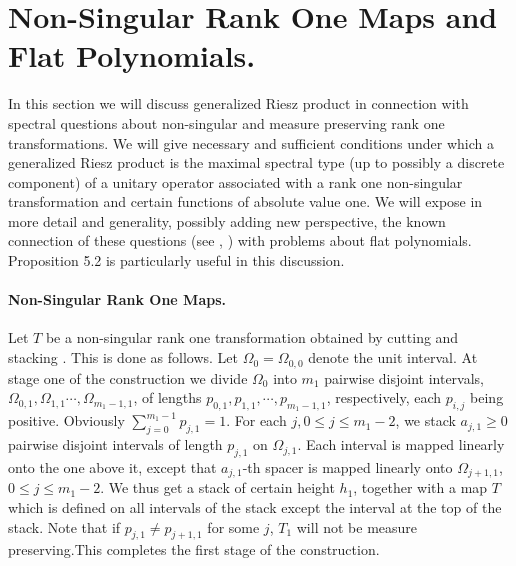\documentclass{amsart}
\theoremstyle{definition}
\theoremstyle{remark}
\numberwithin{equation}{section}
\newcommand{\1}{\mathbb{1}}
\begin{document}
\section{Non-Singular Rank One Maps and Flat Polynomials.}

In this section we will discuss generalized Riesz product in connection with spectral questions about non-singular and measure preserving rank one transformations. We will
 give necessary and sufficient conditions under which a generalized Riesz product is the maximal spectral type (up to possibly a discrete component) of a unitary operator associated with a rank one non-singular transformation and certain functions of absolute value one.
  We will expose in more detail and generality, possibly adding new perspective, the known connection of these questions (see \cite{Guenais}, \cite{down}) with problems about flat polynomials. Proposition 5.2 is particularly useful in this discussion.\\

\paragraph{\textbf{Non-Singular Rank One Maps.}}

Let $T$ be a non-singular rank one transformation obtained by cutting and stacking \cite{Friedman}. This is done as follows. Let $\Omega_0 = \Omega_{0,0}$ denote the unit interval. At stage one of the construction we divide $\Omega_0$ into $m_1$ pairwise disjoint intervals, $\Omega_{0,1}, \Omega_{1, 1} \cdots, \Omega_{m_1-1, 1}$, of lengths $p_{0,1}, p_{1,1},\cdots, p_{m_1-1, 1}$, respectively, each $p_{i,j}$ being positive. Obviously $\sum_{j=0}^{m_1-1}p_{j,1}=1$. For each $j, 0\leq j \leq m_1-2$,  we stack $a_{j,1} \geq 0$ pairwise disjoint intervals of length $p_{j,1}$ on  $\Omega_{j,1}$. Each interval is mapped linearly onto the one above it, except that $a_{j,1}$-th spacer is mapped linearly onto $\Omega_{j+1, 1}$, $0 \leq j \leq m_1-2$.
We thus get a stack of certain height $h_1$, together with a map $T$ which is defined on all intervals of the stack except the interval at the top of the stack.  Note that if $p_{j,1} \neq p_{j+1,1}$ for  some $j$, $T_1$ will not be measure preserving.This completes the first stage of the construction.\\
\end{document}
